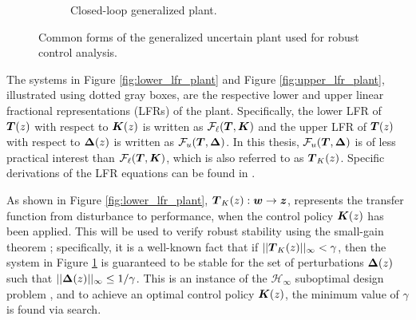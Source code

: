 \begin{figure}[H]
\begin{subfigure}{0.4\textwidth}
{
	\hspace{-55pt}
    }
    \caption{\small Closed-loop generalized plant.}
    \label{fig:closed_loop_plant}
\end{subfigure}

\caption{Common forms of the generalized uncertain plant used for robust control analysis.}
\label{fig:robust_plant_diagrams}
\end{figure}

The systems in Figure \ref{fig:lower_lfr_plant} and Figure \ref{fig:upper_lfr_plant}, illustrated using dotted gray boxes, are the respective lower and upper linear fractional representations (LFRs) of the plant.  Specifically, the lower LFR of $\vb*{T}(z)$ with respect to $\vb*{K}(z)$ is written as $\mathcal{F}_{\ell}(\vb*{T}, \vb*{K})$ and the upper LFR of $\vb*{T}(z)$ with respect to $\vb*{\Delta}(z)$ is written as $\mathcal{F}_{u}(\vb*{T}, \vb*{\Delta})$.  In this thesis, $\mathcal{F}_{u}(\vb*{T}, \vb*{\Delta})$ is of less practical interest than $\mathcal{F}_{\ell}(\vb*{T}, \vb*{K})$, which is also referred to as $\vb*{T}_{K}(z)$.  Specific derivations of the LFR equations can be found in \cite{doyle1991review}.

As shown in Figure \ref{fig:lower_lfr_plant}, $\vb*{T}_{K}(z): \vb*{w} \rightarrow \vb*{z}$, represents the transfer function from disturbance to performance, when the control policy $\vb*{K}(z)$ has been applied.  This will be used to verify robust stability using the small-gain theorem \cite{sandberg1964frequency, zames1966input}; specifically, it is a well-known fact that if $||\vb*{T}_{K}(z)||_{\infty} < \gamma$, then the system in Figure \ref{fig:closed_loop_plant} is guaranteed to be stable for the set of perturbations $\vb*{\Delta}(z)$ such that $||\vb*{\Delta}(z)||_{\infty} \leq 1/\gamma$.  This is an instance of the $\mathcal{H}_{\infty}$ suboptimal design problem \cite{basar1989dynamic, bacsar2008h}, and to achieve an optimal control policy $\vb*{K}(z)$, the minimum value of $\gamma$ is found via search.

